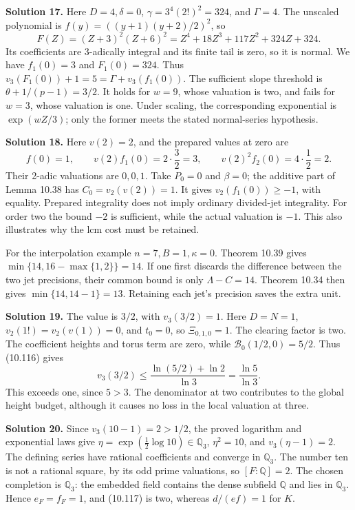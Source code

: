 \documentclass[
  11pt,
  a4paper,
]{article}
\begin{document}
\textbf{Solution 17.} Here \(D=4,\delta=0\), \(\gamma=3^4(2!)^2=324\),
and \(\Gamma=4\). The unscaled polynomial is \(f(y)=((y+1)(y+2)/2)^2\),
so \[
F(Z)=(Z+3)^2(Z+6)^2=Z^4+18Z^3+117Z^2+324Z+324.
\] Its coefficients are 3-adically integral and its finite tail is zero,
so it is normal. We have \(f_1(0)=3\) and \(F_1(0)=324\). Thus
\(v_3(F_1(0))+1=5=\Gamma+v_3(f_1(0))\). The sufficient slope threshold
is \(\theta+1/(p-1)=3/2\). It holds for \(w=9\), whose valuation is two,
and fails for \(w=3\), whose valuation is one. Under scaling, the
corresponding exponential is \(\exp(wZ/3)\); only the former meets the
stated normal-series hypothesis.

\textbf{Solution 18.} Here \(v(2)=2\), and the prepared values at zero
are \[
f(0)=1,\qquad v(2)f_1(0)=2\cdot\frac32=3,
\qquad v(2)^2f_2(0)=4\cdot\frac12=2.
\] Their 2-adic valuations are \(0,0,1\). Take \(P_0=0\) and
\(\beta=0\); the additive part of Lemma 10.38 has \(C_0=v_2(v(2))=1\).
It gives \(v_2(f_1(0))\ge-1\), with equality. Prepared integrality does
not imply ordinary divided-jet integrality. For order two the bound
\(-2\) is sufficient, while the actual valuation is \(-1\). This also
illustrates why the lcm cost must be retained.

For the interpolation example \(n=7,B=1,\kappa=0\). Theorem 10.39 gives
\(\min\{14,16-\max\{1,2\}\}=14\). If one first discards the difference
between the two jet precisions, their common bound is only
\(\Lambda-C=14\). Theorem 10.34 then gives \(\min\{14,14-1\}=13\).
Retaining each jet's precision saves the extra unit.

\textbf{Solution 19.} The value is \(3/2\), with \(v_3(3/2)=1\). Here
\(D=N=1\), \(v_2(1!)=v_2(v(1))=0\), and \(t_0=0\), so \(\Xi_{0,1,0}=1\).
The clearing factor is two. The coefficient heights and torus term are
zero, while \(\mathcal B_0(1/2,0)=5/2\). Thus (10.116) gives \[
v_3(3/2)\le\frac{\ln(5/2)+\ln2}{\ln3}=\frac{\ln5}{\ln3}.
\] This exceeds one, since \(5>3\). The denominator at two contributes
to the global height budget, although it causes no loss in the local
valuation at three.

\textbf{Solution 20.} Since \(v_3(10-1)=2>1/2\), the proved logarithm
and exponential laws give \(\eta=\exp(\tfrac12\log10)\in\mathbb Q_3\),
\(\eta^2=10\), and \(v_3(\eta-1)=2\). The defining series have rational
coefficients and converge in \(\mathbb Q_3\). The number ten is not a
rational square, by its odd prime valuations, so \([F:\mathbb Q]=2\).
The chosen completion is \(\mathbb Q_3\): the embedded field contains
the dense subfield \(\mathbb Q\) and lies in \(\mathbb Q_3\). Hence
\(e_F=f_F=1\), and (10.117) is two, whereas \(d/(ef)=1\) for \(K\).
\end{document}
